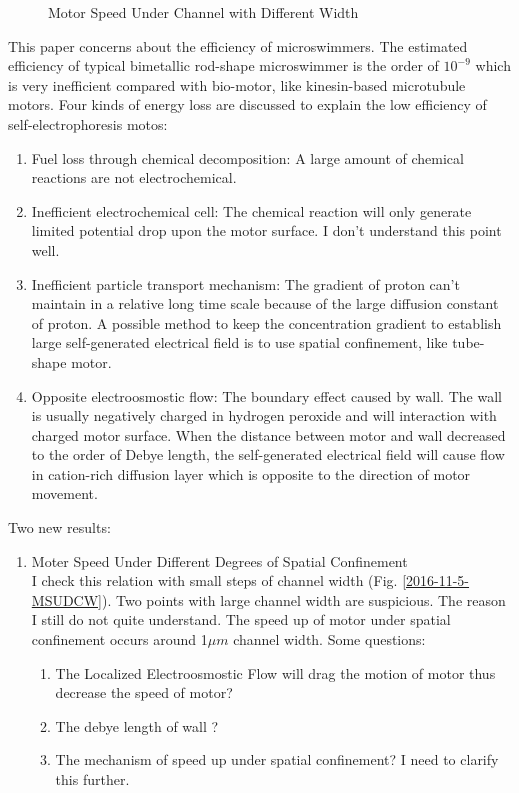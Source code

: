 \documentclass[fontsize=11pt, %
                             paper=a4, %
                             twoside, %
                             captions=tableheading,
                             index=totoc,
                             hyperref]{labbook}
\begin{document}
\begin{addmargin}[4cm]{0cm}
\begin{enumerate}
\begin{figure}
\caption{Motor Speed Under Channel with Different Width}\label{2016-11-3-MSUCWDW}
\end{figure}
\end{enumerate}

This paper concerns about the efficiency of microswimmers. The estimated efficiency of typical bimetallic rod-shape microswimmer is the order of $10^{-9}$ which is very inefficient compared with bio-motor, like kinesin-based microtubule motors. Four kinds of energy loss are discussed to explain the low efficiency of self-electrophoresis motos:
\begin{enumerate}
\item
Fuel loss through chemical decomposition: A large amount of chemical reactions are not electrochemical.
\item
Inefficient electrochemical cell: The chemical reaction will only generate limited potential drop upon the motor surface. I don't understand this point well.
\item
Inefficient particle transport mechanism: The gradient of proton can't maintain in a relative long time scale because of the large diffusion constant of proton. A possible method to keep the concentration gradient to establish large self-generated electrical field is to use spatial confinement, like tube-shape motor.
\item
Opposite electroosmostic flow: The boundary effect caused by wall. The wall is usually negatively charged in hydrogen peroxide and will interaction with charged motor surface. When the distance between motor and wall decreased to the order of Debye length, the self-generated electrical field will cause flow in cation-rich diffusion layer which is opposite to the direction of motor movement.
\end{enumerate}

Two new results:
\begin{enumerate}
\item
Moter Speed Under Different Degrees of Spatial Confinement\\
I check this relation with small steps of channel width (Fig. \ref{2016-11-5-MSUDCW}). Two points with large channel width are suspicious. The reason I still do not quite understand. The speed up of motor under spatial confinement occurs around 1$\mu m$ channel width. Some questions:
\begin{enumerate}
\item
The Localized Electroosmostic Flow will drag the motion of motor thus decrease the speed of motor?
\item
The debye length of wall ?
\item
The mechanism of speed up under spatial confinement? I need to clarify this further.
\end{enumerate}


\end{enumerate}
\end{addmargin}
\end{document}
